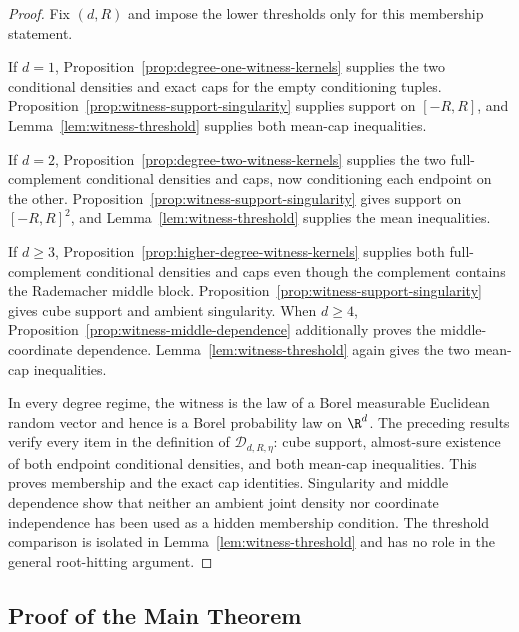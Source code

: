 \begin{proof}
Fix $(d,R)$ and impose the lower thresholds only for this membership
statement.

If $d=1$, Proposition~\ref{prop:degree-one-witness-kernels} supplies the two
conditional densities and exact caps for the empty conditioning tuples.
Proposition~\ref{prop:witness-support-singularity} supplies support on
$[-R,R]$, and Lemma~\ref{lem:witness-threshold} supplies both mean-cap
inequalities.

If $d=2$, Proposition~\ref{prop:degree-two-witness-kernels} supplies the two
full-complement conditional densities and caps, now conditioning each
endpoint on the other.  Proposition~\ref{prop:witness-support-singularity}
gives support on $[-R,R]^2$, and Lemma~\ref{lem:witness-threshold} supplies
the mean inequalities.

If $d\geq3$, Proposition~\ref{prop:higher-degree-witness-kernels} supplies
both full-complement conditional densities and caps even though the
complement contains the Rademacher middle block.
Proposition~\ref{prop:witness-support-singularity} gives cube support and
ambient singularity.  When $d\geq4$,
Proposition~\ref{prop:witness-middle-dependence} additionally proves the
middle-coordinate dependence.  Lemma~\ref{lem:witness-threshold} again gives
the two mean-cap inequalities.

In every degree regime, the witness is the law of a Borel measurable
Euclidean random vector and hence is a Borel probability law on $\R^d$.  The
preceding results verify every item in the definition of
$\mathcal D_{d,R,\eta}$: cube support, almost-sure existence of both endpoint
conditional densities, and both mean-cap inequalities.  This proves
membership and the exact cap identities.  Singularity and middle dependence
show that neither an ambient joint density nor coordinate independence has
been used as a hidden membership condition.  The threshold comparison is
isolated in Lemma~\ref{lem:witness-threshold} and has no role in the general
root-hitting argument.
\end{proof}

\subsection{Proof of the Main Theorem}
\label{app:main-proof}


